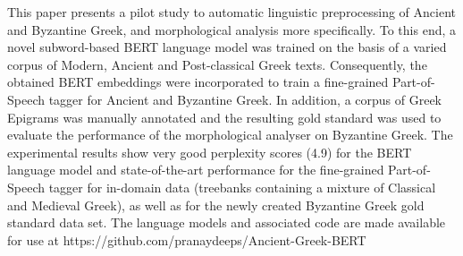 This paper presents a pilot study to automatic linguistic preprocessing of Ancient and Byzantine Greek, and morphological analysis more specifically. To this end, a novel subword-based BERT language model was trained on the basis of a varied corpus of Modern, Ancient and Post-classical Greek texts. Consequently, the obtained BERT embeddings were incorporated to train a fine-grained Part-of-Speech tagger for Ancient and Byzantine Greek. In addition, a corpus of Greek Epigrams was manually annotated and the resulting gold standard was used to evaluate the performance of the morphological analyser on Byzantine Greek. The experimental results show very good perplexity scores (4.9) for the BERT language model and state-of-the-art performance for the fine-grained Part-of-Speech tagger for in-domain data (treebanks containing a mixture of Classical and Medieval Greek), as well as for the newly created Byzantine Greek gold standard data set. The language models and associated code are made available for use at https://github.com/pranaydeeps/Ancient-Greek-BERT
